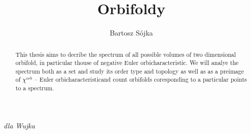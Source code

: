 \documentclass[a4paper, 12pt]{report}
\title{Orbifoldy}
\author{Bartosz Sójka}
\newcommand{\Eoc}{Euler orbicharacteristic}
\begin{document}

\newpage
\null
\thispagestyle{empty}

%
\newpage
\thispagestyle{empty}
\vspace*{19cm}
\hspace*{10cm}
\textit{dla Wujka}
\newpage
\null
\thispagestyle{empty}

\newpage
\tableofcontents
\begin{abstract}
\setcounter{page}{7}
This thesis aims to decribe the spectrum of all possible volumes of 
two dimensional orbifold, in particular thouse of negative \Eoc. 
We will analye the spectrum both as a set and study its order type and topology 
as well as as a preimage of $\chi^{orb}$ -- \Eoc and count orbifolds coresponding 
to a particular points to a spectrum. 
\end{abstract}

%
%






%
%

%
%

\appendix
%

%
\end{document}
